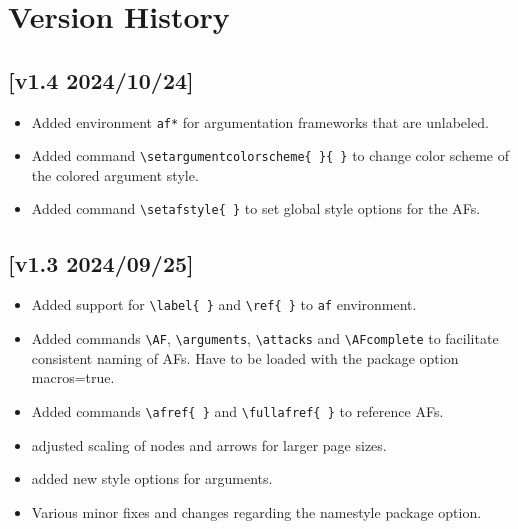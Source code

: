 \documentclass[headings=normal]{scrartcl}
\begin{document}
\newpage
\section{Version History}\label{sec:history}
\subsection*{[v1.4 2024/10/24]}
\begin{itemize}
    \item Added environment \verb|af*| for argumentation frameworks that are unlabeled.
    \item Added command \verb|\setargumentcolorscheme{ }{ }| to change color scheme of the \textsf{colored} argument style.
    \item Added command \verb|\setafstyle{ }| to set global style options for the AFs.
\end{itemize}
\subsection*{[v1.3 2024/09/25]}
\begin{itemize}
    \item Added support for \verb|\label{ }| and \verb|\ref{ }| to \texttt{af} environment.
    \item Added commands \verb|\AF|, \verb|\arguments|, \verb|\attacks| and \verb|\AFcomplete| to facilitate consistent naming of AFs. Have to be loaded with the package option \textsf{macros=true}.
    \item Added commands \verb|\afref{ }| and \verb|\fullafref{ }| to reference AFs.
    \item adjusted scaling of nodes and arrows for larger page sizes.
    \item added new style options for arguments.
    \item Various minor fixes and changes regarding the \textsf{namestyle} package option.
\end{itemize}
\end{document}

